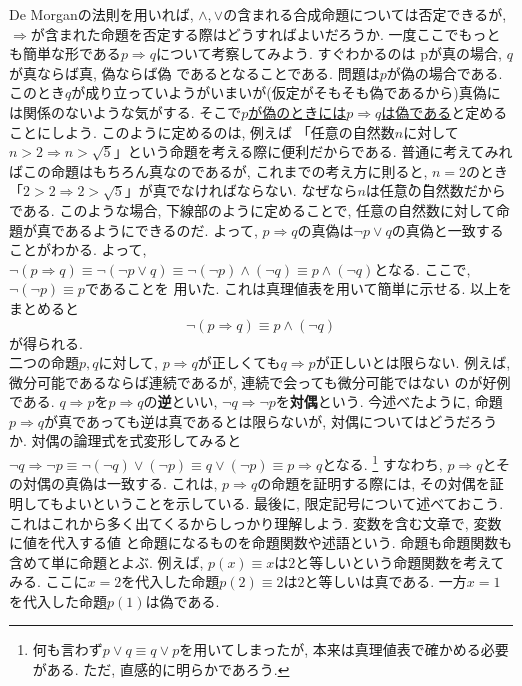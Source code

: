 \documentclass[a4j,dvipdfmx]{jsarticle}
\numberwithin{equation}{section}
\begin{document}
            De Morganの法則を用いれば, $\land,\lor$の含まれる合成命題については否定できるが, $\Rightarrow$が含まれた命題を否定する際はどうすればよいだろうか.
            一度ここでもっとも簡単な形である$p \Rightarrow q$について考察してみよう. すぐわかるのは pが真の場合, $q$が真ならば真, 偽ならば偽
            であるとなることである. 問題は$p$が偽の場合である. このとき$q$が成り立っていようがいまいが(仮定がそもそも偽であるから)真偽には関係のないような気がする.
            そこで\underline{$p$が偽のときには$p\Rightarrow q$は偽である}と定めることにしよう. このように定めるのは, 例えば
            「任意の自然数$n$に対して$n>2\Rightarrow n > \sqrt{5}$」という命題を考える際に便利だからである. 普通に考えてみればこの命題はもちろん真なのであるが, 
            これまでの考え方に則ると, $n=2$のとき「$2>2\Rightarrow 2>\sqrt{5}$」が真でなければならない. なぜなら$n$は\.{任}\.{意}\.{の}自然数だからである. このような場合, 
            下線部のように定めることで, 任意の自然数に対して命題が真であるようにできるのだ. よって, $p\Rightarrow q$の真偽は$\lnot p\lor q$の真偽と一致することがわかる.
            よって, $\lnot (p\Rightarrow q)\equiv \lnot (\lnot p\lor q)\equiv \lnot(\lnot p) \land (\lnot q)\equiv p\land (\lnot q)$となる. ここで, $\lnot (\lnot p)\equiv p$であることを
            用いた. これは真理値表を用いて簡単に示せる.
            以上をまとめると
            \begin{equation}
                \lnot (p \Rightarrow q) \equiv p \land (\lnot q) \label{eq:集合論基礎:ならばの否定}
            \end{equation}
            が得られる. \\

            二つの命題$p,q$に対して, $p\Rightarrow q$が正しくても$q\Rightarrow p$が正しいとは限らない. 例えば, 微分可能であるならば連続であるが, 連続で会っても微分可能ではない
            のが好例である.  $q\Rightarrow p$を$p\Rightarrow q$の\textbf{逆}といい, $\lnot q\Rightarrow \lnot p$を\textbf{対偶}という.
            今述べたように, 命題$p\Rightarrow q$が真であっても逆は真であるとは限らないが, 対偶についてはどうだろうか. 対偶の論理式を式変形してみると
            $\lnot q\Rightarrow \lnot p\equiv \lnot (\lnot q) \lor (\lnot p) \equiv q \lor (\lnot p)\equiv p \Rightarrow q$となる. \footnote{何も言わず$p\lor q \equiv q \lor p$を用いてしまったが, 本来は真理値表で確かめる必要がある. ただ, 直感的に明らかであろう.}
            すなわち, $p \Rightarrow q$とその対偶の真偽は一致する. これは, $p \Rightarrow q$の命題を証明する際には, その対偶を証明してもよいということを示している.
            \clearpage
            最後に, 限定記号について述べておこう. これはこれから多く出てくるからしっかり理解しよう. 変数を含む文章で, 変数に値を代入する値
            と命題になるものを命題関数や述語という. 命題も命題関数も含めて単に命題とよぶ. 例えば, $p(x)\equiv\text{$x$は2と等しい}$という命題関数を考えてみる. ここに$x=2$を代入した命題$p(2)\equiv\text{$2$は2と等しい}$は真である.
            一方$x=1$を代入した命題$p(1)$は偽である.\\
\end{document}

